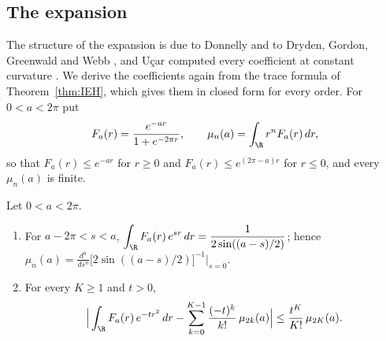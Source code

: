 %

\subsection{The expansion}\label{sec:heatexp}

The structure of the expansion is due to Donnelly and to Dryden, Gordon, Greenwald and Webb
\cite{donnelly1976,dggw2008}, and U\c{c}ar computed every coefficient at constant curvature
\cite{ucar2017}. We derive the coefficients again from the trace formula of
Theorem~\ref{thm:IEH}, which gives them in closed form for every order. For $0<a<2\pi$ put
\[
  F_a(r)=\frac{e^{-ar}}{1+e^{-2\pi r}},\qquad \mu_n(a)=\int_\R r^nF_a(r)\,dr ,
\]
so that $F_a(r)\le e^{-ar}$ for $r\ge0$ and $F_a(r)\le e^{(2\pi-a)r}$ for $r\le0$, and every
$\mu_n(a)$ is finite.

\begin{lemma}\label{lem:ellmoments}
Let $0<a<2\pi$.
\begin{enumerate}[label=(\roman*)]
\item For $a-2\pi<s<a$, $\displaystyle\int_\R F_a(r)\,e^{sr}\,dr=\frac1{2\sin((a-s)/2)}$; hence
  $\mu_n(a)=\frac{d^n}{ds^n}\big[2\sin((a-s)/2)\big]^{-1}\big|_{s=0}$.
\item For every $K\ge1$ and $t>0$,
  \[
    \Big|\int_\R F_a(r)\,e^{-tr^2}\,dr-\sum_{k=0}^{K-1}\frac{(-t)^k}{k!}\,\mu_{2k}(a)\Big|
    \le\frac{t^K}{K!}\,\mu_{2K}(a).
  \]
\end{enumerate}
\end{lemma}

